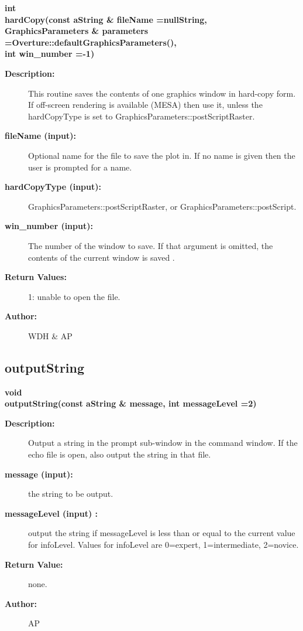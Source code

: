 \begin{flushleft} \textbf{%
int  \\ 
\settowidth{\GLGraphicsInterfaceIncludeArgIndent}{hardCopy(}%
hardCopy(const aString \& fileName =nullString,\\ 
GraphicsParameters \& parameters  =Overture::defaultGraphicsParameters(),\\ 
\hspace{\GLGraphicsInterfaceIncludeArgIndent}int win\_number  =-1)
}\end{flushleft}
\begin{description}
\item[{\bf Description:}] 
    This routine saves the contents of one graphics window in hard-copy form.
    If off-screen rendering is available (MESA) then use it, unless the hardCopyType is
    set to GraphicsParameters::postScriptRaster.
\item[{\bf fileName (input):}]  Optional name for the file to save the plot in. If no name is given then
     the user is prompted for a name.
\item[{\bf hardCopyType (input):}]  GraphicsParameters::postScriptRaster, or GraphicsParameters::postScript.
\item[{\bf win\_number (input):}]  The number of the window to save. If that argument is omitted, the 
  contents of the current window is saved .
\item[{\bf Return Values:}]  1: unable to open the file.

\item[{\bf Author:}]  WDH \& AP

\end{description}
\subsection{outputString}
 
\begin{flushleft} \textbf{%
void  \\ 
\settowidth{\GLGraphicsInterfaceIncludeArgIndent}{outputString(}%
outputString(const aString \& message, int messageLevel  =2)
}\end{flushleft}
\begin{description}
\item[{\bf Description:}] 
   Output a string in the prompt sub-window in the command window.
   If the echo file is open, also output the string in that file.
\item[{\bf message (input):}]  the string to be output.
\item[{\bf messageLevel (input) :}]  output the string if messageLevel is less than or equal
    to the current value for infoLevel. Values for infoLevel are 0=expert, 1=intermediate, 2=novice.

\item[{\bf Return Value:}]  none.

\item[{\bf Author:}]  AP
\end{description}

